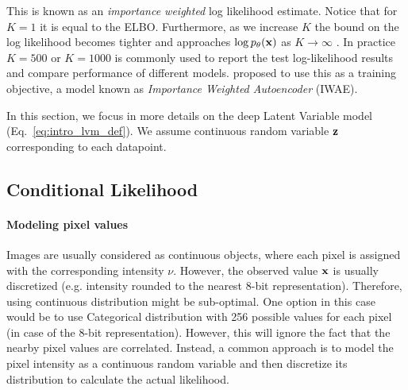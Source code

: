 This is known as an \textit{importance weighted} log likelihood estimate. Notice that for $K=1$ it is equal to the ELBO. Furthermore, as we increase $K$ the bound on the log likelihood becomes tighter and approaches $\log p_{\theta}({\mathbf{x}})$ as $K \rightarrow \infty$ \citep{burda2015importance}. In practice $K=500$ or $K=1000$ is commonly used to report the test log-likelihood results and compare performance of different models. \citet{burda2015importance} proposed to use this as a training objective, a model known as \textit{Importance Weighted Autoencoder} (IWAE). 


 


In this section, we focus in more details on the deep Latent Variable model (Eq.~\ref{eq:intro_lvm_def}). We assume continuous random variable ${\mathbf{z}}$ corresponding to each datapoint. 

\subsection{Conditional Likelihood}
\paragraph{Modeling pixel values}
Images are usually considered as continuous objects, where each pixel is assigned with the corresponding intensity $\nu$. 
However, the observed value ${\mathbf{x}}$ is usually discretized (e.g. intensity rounded to the nearest 8-bit representation). 
Therefore, using continuous distribution might be sub-optimal.
One option in this case would be to use Categorical distribution with 256 possible values for each pixel (in case of the 8-bit representation). However, this will ignore the fact that the nearby pixel values are correlated. 
Instead, a common approach is to model the pixel intensity as a continuous random variable and then discretize its distribution to calculate the actual likelihood. 

